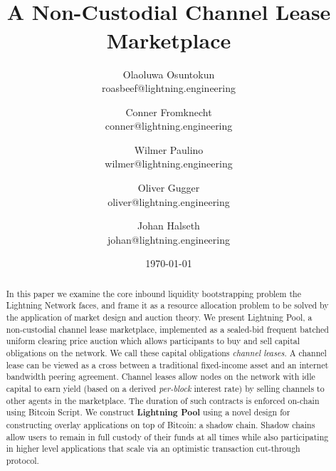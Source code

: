 \documentclass[10pt,a4paper]{article}
\theoremstyle{definition}
\begin{document}
\title{\texttt{} \\
    A Non-Custodial Channel Lease Marketplace}
\author{
    Olaoluwa Osuntokun \\ 
    \small{roasbeef@lightning.engineering}
    \and
    Conner Fromknecht \\
    \small{conner@lightning.engineering}
     \and
     Wilmer Paulino  \\
    \small{wilmer@lightning.engineering}
     \and
     Oliver Gugger \\
    \small{oliver@lightning.engineering}
     \and
     Johan Halseth \\
    \small{johan@lightning.engineering}
}

\date{\today}
\maketitle

\begin{abstract}


In this paper we examine the core inbound liquidity bootstrapping problem the
Lightning Network faces, and frame it as a resource allocation problem to be
solved by the application of market design and auction theory. We present Lightning
Pool, a non-custodial channel lease marketplace, implemented as a sealed-bid
frequent batched uniform clearing price auction which allows participants to
buy and sell capital obligations on the network. We call these capital obligations
\emph{channel leases}. A channel lease can be viewed as a cross between a
traditional fixed-income asset and an internet bandwidth peering agreement. Channel
leases allow nodes on the network with idle capital to earn yield (based on a
derived \emph{per-block} interest rate) by selling channels to other agents in
the marketplace. The duration of such contracts is enforced on-chain using
Bitcoin Script. We construct \textbf{Lightning Pool} using a novel design for
constructing overlay applications on top of Bitcoin: a shadow chain. Shadow
chains allow users to remain in full custody of their funds at all times while
also participating in higher level applications that scale via an optimistic
transaction cut-through protocol.

\end{abstract} 
\end{document}
